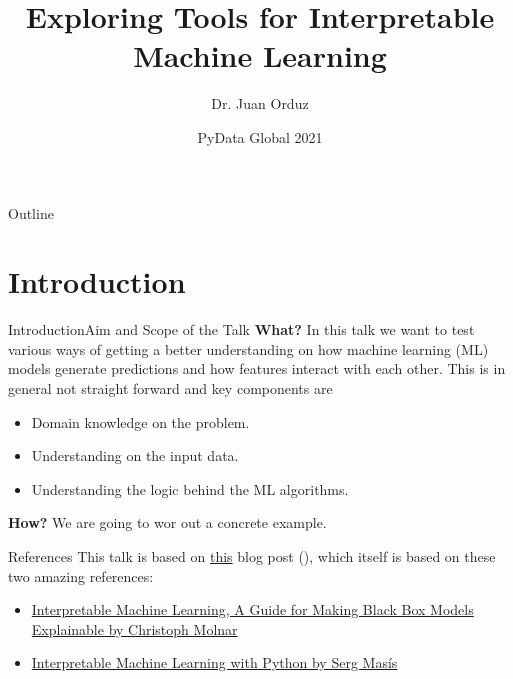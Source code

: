 \documentclass[10pt]{beamer}
\title[Exploring Tools for Interpretable Machine Learning] %
{Exploring Tools for Interpretable Machine Learning}
\author[Dr. Juan Orduz] %
{Dr. Juan Orduz}
\institute[PyData Global 2021] %
{}
\date[PyData Global 2021] %
{PyData Global 2021}
\begin{document}
\begin{frame}
  \titlepage
\end{frame}

\begin{frame}{Outline}
\tableofcontents
\end{frame}

\section{Introduction}

\begin{frame}{Introduction}{Aim and Scope of the Talk}
{\bf What?} In this talk we want to test various ways of getting a better understanding on how machine learning (ML) models generate predictions and how features interact with each other. This is in general not straight forward and key components are
\begin{itemize}
\item Domain knowledge on the problem. 
\item Understanding on the input data.
\item Understanding the logic behind the ML algorithms.
\end{itemize}
{\bf How?} We are going to wor out a concrete example.
\pause
\begin{block}{References}
This talk is based on \href{https://juanitorduz.github.io/interpretable_ml/}{this} blog post (\cite{interpretable_ml_orduz_2021}), which itself is based on these two amazing references:
\begin{itemize}
\item \href{https://christophm.github.io/interpretable-ml-book/}{Interpretable Machine Learning, A Guide for Making Black Box Models Explainable by Christoph Molnar}
\item \href{https://github.com/PacktPublishing/Interpretable-Machine-Learning-with-Python}{Interpretable Machine Learning with Python by Serg Mas\'is}
\end{itemize}
\end{block}
\end{frame}
\end{document}
